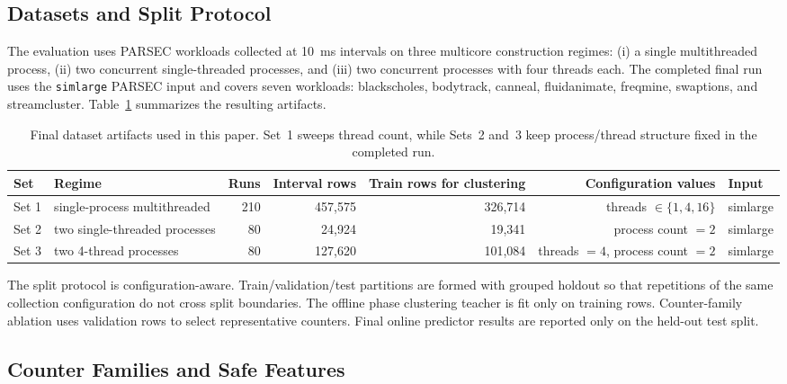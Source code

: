 \documentclass[10pt,twocolumn]{article}
\begin{document}
\subsection{Datasets and Split Protocol}

The evaluation uses PARSEC workloads collected at 10~ms intervals on three multicore construction regimes:
(i) a single multithreaded process, (ii) two concurrent single-threaded processes, and (iii) two concurrent processes with four threads each.
The completed final run uses the \texttt{simlarge} PARSEC input and covers seven workloads: blackscholes, bodytrack, canneal, fluidanimate, freqmine, swaptions, and streamcluster.
Table~\ref{tab:datasets} summarizes the resulting artifacts.

\begin{table}[t]
  \centering
  \small
  \caption{Final dataset artifacts used in this paper. Set~1 sweeps thread count, while Sets~2 and~3 keep process/thread structure fixed in the completed run.}
  \label{tab:datasets}
  \begin{tabular}{llrrrrl}
    \toprule
    Set & Regime & Runs & Interval rows & Train rows for clustering & Configuration values & Input \\
    \midrule
    Set 1 & single-process multithreaded & 210 & 457{,}575 & 326{,}714 & threads $\in \{1,4,16\}$ & simlarge \\
    Set 2 & two single-threaded processes & 80 & 24{,}924 & 19{,}341 & process count $=2$ & simlarge \\
    Set 3 & two 4-thread processes & 80 & 127{,}620 & 101{,}084 & threads $=4$, process count $=2$ & simlarge \\
    \bottomrule
  \end{tabular}
\end{table}

The split protocol is configuration-aware.
Train/validation/test partitions are formed with grouped holdout so that repetitions of the same collection configuration do not cross split boundaries.
The offline phase clustering teacher is fit only on training rows.
Counter-family ablation uses validation rows to select representative counters.
Final online predictor results are reported only on the held-out test split.

\subsection{Counter Families and Safe Features}
\end{document}
